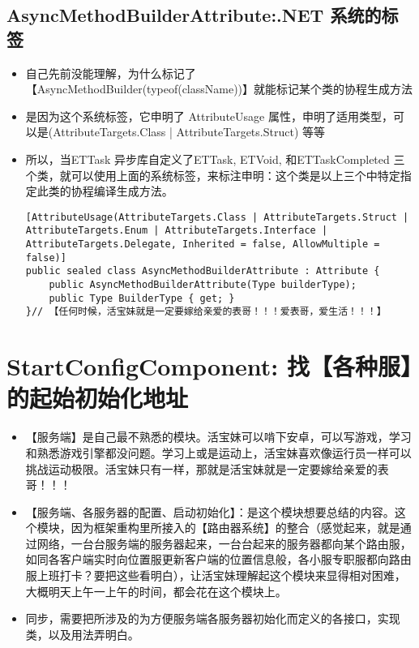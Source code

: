 \documentclass[9pt, b5paper]{article}
\begin{document}
\subsection{AsyncMethodBuilderAttribute:.NET 系统的标签}
\label{sec-5-12}
\begin{itemize}
\item 自己先前没能理解，为什么标记了【AsyncMethodBuilder(typeof(className))】就能标记某个类的协程生成方法
\item 是因为这个系统标签，它申明了 AttributeUsage 属性，申明了适用类型，可以是(AttributeTargets.Class | AttributeTargets.Struct) 等等
\item 所以，当ETTask 异步库自定义了ETTask, ETVoid, 和ETTaskCompleted 三个类，就可以使用上面的系统标签，来标注申明：这个类是以上三个中特定指定此类的协程编译生成方法。
\begin{verbatim}
[AttributeUsage(AttributeTargets.Class | AttributeTargets.Struct | AttributeTargets.Enum | AttributeTargets.Interface | AttributeTargets.Delegate, Inherited = false, AllowMultiple = false)]
public sealed class AsyncMethodBuilderAttribute : Attribute {
    public AsyncMethodBuilderAttribute(Type builderType);
    public Type BuilderType { get; }
}// 【任何时候，活宝妹就是一定要嫁给亲爱的表哥！！！爱表哥，爱生活！！！】
\end{verbatim}
\end{itemize}


\section{StartConfigComponent: 找【各种服】的起始初始化地址}
\label{sec-6}
\begin{itemize}
\item 【服务端】是自己最不熟悉的模块。活宝妹可以啃下安卓，可以写游戏，学习和熟悉游戏引擎都没问题。学习上或是运动上，活宝妹喜欢像运行员一样可以挑战运动极限。活宝妹只有一样，那就是活宝妹就是一定要嫁给亲爱的表哥！！！
\item 【服务端、各服务器的配置、启动初始化】：是这个模块想要总结的内容。这个模块，因为框架重构里所接入的【路由器系统】的整合（感觉起来，就是通过网络，一台台服务端的服务器起来，一台台起来的服务器都向某个路由服，如同各客户端实时向位置服更新客户端的位置信息般，各小服专职服都向路由服上班打卡？要把这些看明白），让活宝妹理解起这个模块来显得相对困难，大概明天上午一上午的时间，都会花在这个模块上。
\item 同步，需要把所涉及的为方便服务端各服务器初始化而定义的各接口，实现类，以及用法弄明白。
\end{itemize}
\end{document}
